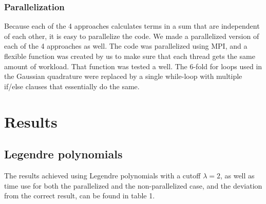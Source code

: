 \documentclass[10pt,a4paper]{article}
\begin{document}
\subsubsection{Parallelization}
Because each of the 4 approaches calculates terms in a sum that are independent of each other, it is easy to parallelize the code. We made a parallelized version of each of the 4 approaches as well. The code was parallelized using MPI, and a flexible function was created by us to make sure that each thread gets the same amount of workload. That function was tested a well. The 6-fold for loops used in the Gaussian quadrature were replaced by a single while-loop with multiple if/else clauses that essentially do the same.

\section{Results}
\subsection{Legendre polynomials}
The results achieved using Legendre polynomials with a cutoff $\lambda=2$, as well as time use for both the parallelized and the non-parallelized case, and the deviation from the correct result, can be found in table 1.
\end{document}
